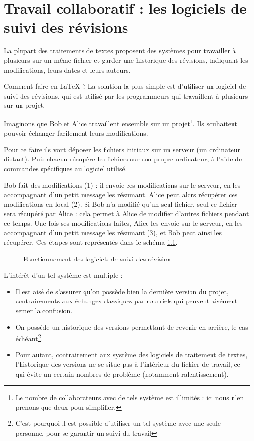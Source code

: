 \chapter{Travail collaboratif : les logiciels de suivi des révisions}	%

\begin{prealable}
	La plupart des traitements de textes proposent des systèmes pour travailler à plusieurs sur un même fichier et garder une historique des révisions, indiquant les modifications, leurs dates et leurs auteurs. 
	
	Comment faire en \LaTeX{} ? La solution la plus simple est d'utiliser un logiciel de suivi des révisions, qui est utilisé par les programmeurs qui travaillent à plusieurs sur un projet.
\end{prealable}

Imaginons que Bob et Alice travaillent ensemble sur un projet\footnote{Le nombre de collaborateurs avec de tels système est illimités : ici nous n'en prenons que deux pour simplifier.}. Ils souhaitent pouvoir échanger facilement leurs modifications.

Pour ce faire ils vont déposer les fichiers initiaux sur un serveur (un ordinateur distant). Puis chacun récupère les fichiers sur son propre ordinateur, à l'aide de commandes spécifiques au logiciel utilisé.

Bob fait des modifications (1) : il envoie ces modifications sur le serveur, en les accompagnant d'un petit message les résumant. Alice peut alors récupérer ces modifications en local (2). Si Bob n'a modifié qu'un seul fichier, seul ce fichier sera récupéré par Alice : cela permet à Alice de modifier d'autres fichiers pendant ce temps. Une fois ses modifications faites, Alice les envoie sur le serveur, en les accompagnant d'un petit message les résumant (3), et Bob peut ainsi les récupérer. Ces étapes sont représentés dans le schéma \ref{svn}.

\begin{figure}[ht]
\centering

\caption{Fonctionnement des logiciels de suivi des révision}\label{svn}
\end{figure}

L'intérêt d'un tel système est multiple :
\begin{itemize}
\item Il est aisé de s'assurer qu'on possède bien la dernière version du projet, contrairements aux échanges classiques par courriels qui peuvent aisément semer la confusion.
\item On possède un historique des versions permettant de revenir en arrière, le cas échéant\footnote{C'est pourquoi il est possible d'utiliser un tel système avec une seule personne, pour se garantir un suivi du travail}.
\item Pour autant, contrairement aux système des logiciels de traitement de textes, l'historique des versions ne se situe pas à l'intérieur du fichier de travail, ce qui évite un certain nombres de problème (notamment ralentissement).
\end{itemize}

